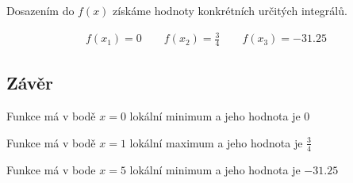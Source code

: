 \noindent Dosazením do $f(x)$ získáme hodnoty konkrétních určitých integrálů.

\begin{align*}
	f(x_1) = 0 \qquad f(x_2) = \frac{3}{4} \qquad f(x_3) = -31.25
\end{align*}

\subsection*{Závěr}
\noindent Funkce má v bodě $x = 0$ lokální minimum a jeho hodnota je $0$

\noindent Funkce má v bodě $x = 1$ lokální maximum a jeho hodnota je $\frac{3}{4}$

\noindent Funkce má v bode $x = 5$ lokální minimum a jeho hodnota je $-31.25$